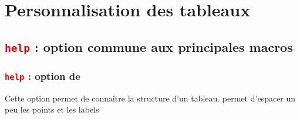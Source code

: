 \section{Personnalisation des tableaux}\label{pers}

\subsection{\texttt{\textcolor{red}{help}} :  option commune aux principales macros}

\subsubsection{\texttt{\textcolor{red}{help}} :  option de }
Cette option permet de connaître la structure d'un tableau.  permet d'espacer un peu les points et les labels

\begin{tkzexample}[small]
\end{tkzexample}

 
